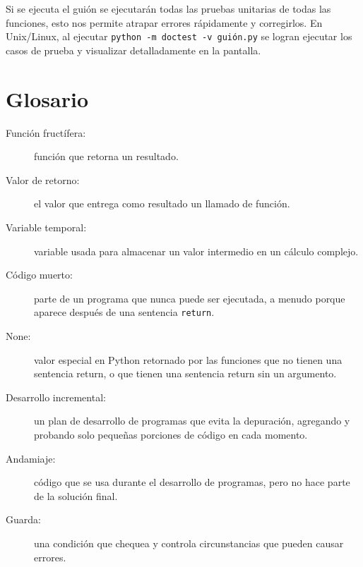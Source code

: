 Si se ejecuta el guión se ejecutarán todas las pruebas unitarias de
todas las funciones, esto nos permite atrapar errores rápidamente
y corregirlos. En Unix/Linux, al ejecutar \verb+python -m doctest -v guión.py+
se logran ejecutar los casos de prueba y visualizar detalladamente
en la pantalla.

\section{Glosario}
\begin{description}
\item [{Función fructífera:}] función que retorna un resultado.
\item [{Valor de retorno:}] el valor que entrega como resultado un llamado
de función.
\item [{Variable temporal:}] variable usada para almacenar un valor intermedio
en un cálculo complejo.
\item [{Código muerto:}] parte de un programa que nunca puede ser ejecutada,
a menudo porque aparece después de una sentencia \texttt{return}.
\item [{None:}] valor especial en Python retornado por las funciones que
no tienen una sentencia return, o que tienen una sentencia return
sin un argumento.
\item [{Desarrollo incremental:}] un plan de desarrollo de programas que
evita la depuración, agregando y probando solo pequeñas porciones
de código en cada momento.
\item [{Andamiaje:}] código que se usa durante el desarrollo de programas,
pero no hace parte de la solución final.
\item [{Guarda:}] una condición que chequea y controla circunstancias que
pueden causar errores.

  
  
 
\end{description}

